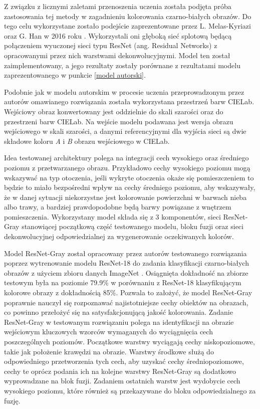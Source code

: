   Z związku z licznymi zaletami przenoszenia uczenia została podjęta próba
  zastosowania tej metody w
  zagadnieniu kolorowania czarno-białych obrazów. Do tego celu wykorzystane
  zostało podejście zaprezentowane przez L. Melas-Kyriazi oraz G. Han w 2016
  roku \cite{deconvolution_colorization}. Wykorzystali oni głęboką sieć
  splotową będącą połączeniem wyuczonej sieci typu ResNet
  (ang. Residual Networks) \cite{ResNet}
  z opracowanymi przez nich warstwami dekonwolucyjnymi. Model ten został
  zaimplementowany, a jego rezultaty zostały porównane z
  rezultatami modelu zaprezentowanego w punkcie \ref{model autorski}.

  Podobnie jak w modelu autorskim w procesie uczenia przeprowadzonym przez
  autorów omawianego rozwiązania została wykorzystana przestrzeń
  barw CIELab. Wejściowy obraz konwertowany jest oddzielnie do skali szarości oraz do
  przestrzeni barw CIELab. Na wejście modelu podawana jest wersja obrazu
  wejściowego w skali szarości, a danymi referencyjnymi dla wyjścia sieci są
  dwie składowe koloru \textit{A} i \textit{B} obrazu wejściowego w CIELab.

  Idea testowanej architektury
  polega na integracji cech wysokiego oraz średniego poziomu z przetwarzanego obrazu.
  Przykładowo cechy wysokiego poziomu mogą wskazywać na typ otoczenia, jeśli
  wykryte otoczenia okaże się pomieszczeniem to będzie to miało bezpośredni wpływ
  na cechy średniego poziomu, aby wskazywały, że w danej
  sytuacji niekorzystne jest kolorowanie powierzchni w barwach nieba albo trawy,
  a bardziej prawdopodobne będą barwy powiązane z wnętrzem pomieszczenia.
  Wykorzystany model składa się z 3 komponentów, sieci ResNet-Gray stanowiącej
  początkową część testowanego modelu, bloku fuzji oraz sieci dekonwolucyjnej
  odpowiedzialnej za wygenerowanie oczekiwanych kolorów.

  Model ResNet-Gray został opracowany przez autorów testowanego rozwiązania poprzez
  wytrenowanie modelu ResNet-18 do zadania klasyfikacji czarno-białych obrazów
  z użyciem zbioru danych ImageNet \cite{ImageNet}. Osiągnięta dokładność na zbiorze testowym
  była na poziomie 79.9\% w porównaniu z ResNet-18 klasyfikującym kolorowe obrazy z
  dokładnością 85\%. Pozwala to założyć, że model ResNet-Gray poprawnie nauczył
  się rozpoznawać najistotniejsze cechy obiektów na obrazach, co powinno
  przełożyć się na satysfakcjonującą jakość kolorowania.
  Zadanie ResNet-Gray w testowanym rozwiązaniu polega na identyfikacji
  na obrazie wejściowym kluczowych wzorców wymaganych do wyciągnięcia cech
  poszczególnych poziomów. Początkowe warstwy wyciągają cechy niskopoziomowe, takie jak położenie krawędzi na obrazie. Warstwy środkowe
  służą do odpowiedniego przetworzenia tych cech, aby uzyskać cechy średniopoziomowe,
  cechy te oprócz podania ich na kolejne warstwy ResNet-Gray są dodatkowo wyprowadzane
  na blok fuzji. Zadaniem ostatnich warstw jest wydobycie cech
  wysokiego poziomu, które również są przekazywane do bloku odpowiedzialnego za
  fuzję.

